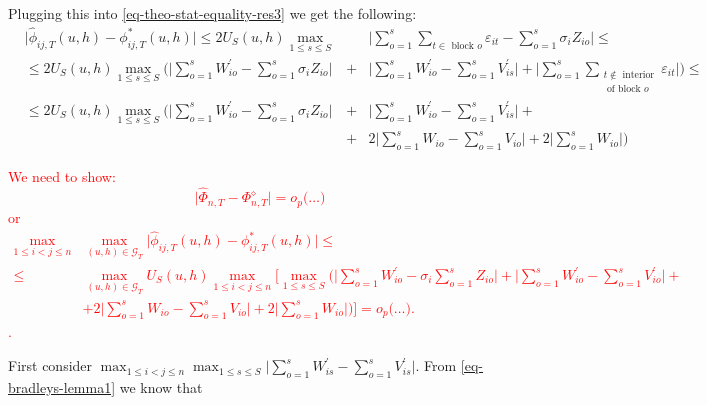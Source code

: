 \documentclass[a4paper,12pt]{article}
\begin{document}
Plugging this into \eqref{eq-theo-stat-equality-res3} we get the following:
\begin{align}\label{eq-theo-stat-equality-res4}
		 &\big| \widehat{\phi}_{ij,T}(u,h) - \phi_{ij,T}^*(u,h) \big| \le 2U_S(u,h) \max_{1 \le s \le S} &&\bigg| \sum\limits_{o=1}^s \sum_{t \in \text{ block } o}\varepsilon_{it} - \sum\limits_{o=1}^s  \sigma_i  Z_{io}\bigg| \le\nonumber\\
		&\le  2U_S(u, h) \max_{1 \le s \le S} \bigg( \bigg| \sum\limits_{o=1}^s W_{io}^\prime - \sum\limits_{o=1}^s  \sigma_i  Z_{io}\bigg| &+& \bigg|\sum\limits_{o=1}^s W_{io}^\prime - \sum\limits_{o=1}^s  V_{is}^\prime\bigg| + \bigg|  \sum\limits_{o=1}^s\sum_{\substack{t \notin \text{ interior} \\ \text{ of block }o}} \varepsilon_{it}\bigg| \bigg) \le  \nonumber\\
		&\le 2U_S(u, h) \max_{1 \le s \le S} \bigg( \bigg| \sum\limits_{o=1}^s W_{io}^\prime - \sum\limits_{o=1}^s  \sigma_i  Z_{io}\bigg| &+& \bigg|\sum\limits_{o=1}^s W_{io}^\prime - \sum\limits_{o=1}^s  V_{is}^\prime\bigg| +\nonumber\\
		 &&+&2\bigg|  \sum\limits_{o=1}^s  W_{io} - \sum\limits_{o=1}^s  V_{io} \bigg| +2\bigg|  \sum\limits_{o=1}^s W_{io}\bigg|  \bigg)
\end{align}

\textcolor{red}{We need to show: 
\begin{equation}
\big| \widehat{\Phi}_{n,T} - \Phi_{n,T}^\diamond \big| = o_p \Big(\ldots \Big)
\end{equation}
or 
\begin{align*}
\max_{1\le i < j \le n}&\max_{(u,h) \in \mathcal{G}_T} \big| \widehat{\phi}_{ij,T}(u,h) - \phi^*_{ij,T}(u,h) \big| \le \\
 \le &\max_{(u,h) \in \mathcal{G}_T}U_S(u, h) \max_{1\le i < j \le n} \Bigg[ \max_{1 \le s \le S} \bigg( \bigg| \sum\limits_{o=1}^s W_{io}^\prime -  \sigma_i \sum\limits_{o=1}^s Z_{io}\bigg| + \bigg|\sum\limits_{o=1}^s W_{io}^\prime - \sum\limits_{o=1}^s  V_{io}^\prime\bigg| +\\
		 &+2\bigg|  \sum\limits_{o=1}^s  W_{io} - \sum\limits_{o=1}^s  V_{io} \bigg| +2\bigg|  \sum\limits_{o=1}^s W_{io}\bigg|  \bigg)\Bigg] = o_p \Big( \ldots \Big). 
\end{align*}.
}

First consider $\max_{1\le i < j \le n} \max_{1 \le s \le S} \bigg|\sum\limits_{o=1}^s W_{is}^\prime - \sum\limits_{o=1}^s  V_{is}^\prime\bigg|$. From \eqref{eq-bradleys-lemma1} we know that 
\end{document}
